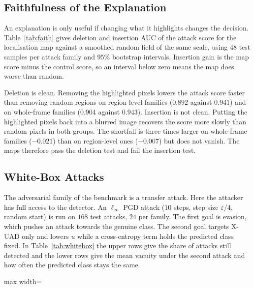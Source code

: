 \documentclass[conference]{IEEEtran}
\newcommand{\sub}[1]{\subsection{\texorpdfstring{\textbf{#1}}{#1}}}
\newlength{\tabw}
\newcommand{\fittab}[1]{\begin{adjustbox}{max width=\tabw}#1\end{adjustbox}}
\begin{document}
\begin{table}
\centering
\caption{Localisation IoU (\%)}
\label{tab:loc}
\scriptsize

\end{table}

\sub{Faithfulness of the Explanation}
An explanation is only useful if changing what it highlights changes the decision.
Table~\ref{tab:faith} gives deletion and insertion AUC \cite{petsiuk2018rise} of the
attack score for the localisation map against a smoothed random field of the same
scale, using $48$ test samples per attack family and $95\%$ bootstrap intervals.
Insertion gain is the map score minus the control score, so an interval below zero
means the map does worse than random.

\begin{table}
\centering
\caption{Faithfulness of the map}
\label{tab:faith}
\scriptsize

\end{table}

Deletion is clean. Removing the highlighted pixels lowers the attack score faster
than removing random regions on region-level families ($0.892$ against $0.941$) and
on whole-frame families ($0.904$ against $0.943$). Insertion is not clean. Putting the
highlighted pixels back into a blurred image recovers the score more slowly than
random pixels in both groups. The shortfall is three times larger on whole-frame
families ($-0.021$) than on region-level ones ($-0.007$) but does not vanish. The maps
therefore pass the deletion test and fail the insertion test.

\sub{White-Box Attacks}
The adversarial family of the benchmark is a transfer attack. Here the attacker has
full access to the detector. An $\ell_\infty$ PGD attack \cite{madry2018pgd} ($10$
steps, step size $\varepsilon/4$, random start) is run on $168$ test attacks, $24$
per family. The first goal is evasion, which pushes an attack towards the genuine
class. The second goal targets X-UAD only and lowers $u$ while a cross-entropy term
holds the predicted class fixed. In Table~\ref{tab:whitebox} the upper rows give the
share of attacks still detected and the lower rows give the mean vacuity under the
second attack and how often the predicted class stays the same.

\begin{table}
\centering
\caption{White-box PGD results}
\label{tab:whitebox}
\scriptsize
\fittab{}
\end{table}
\end{document}

